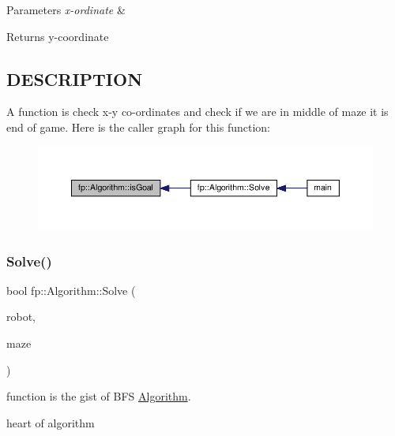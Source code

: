 \begin{DoxyParams}{Parameters}
{\em x-\/ordinate} & \\
\hline
\end{DoxyParams}
\begin{DoxyReturn}{Returns}
y-\/coordinate 
\end{DoxyReturn}
\hypertarget{_m_a_z_e_8h_DESCRIPTION}{}\subsection{D\+E\+S\+C\+R\+I\+P\+T\+I\+ON}\label{_m_a_z_e_8h_DESCRIPTION}
A function is check x-\/y co-\/ordinates and check if we are in middle of maze it is end of game. Here is the caller graph for this function\+:
\nopagebreak
\begin{figure}[H]
\begin{center}
\leavevmode
\includegraphics[width=350pt]{classfp_1_1_algorithm_a237fc28eed2899786cd06f4e5a0e7333_icgraph}
\end{center}
\end{figure}
\mbox{\label{classfp_1_1_algorithm_a2e66300e1507ff3f71d5fbbffede52a3}} 
\subsubsection{\texorpdfstring{Solve()}{Solve()}}
{\footnotesize\ttfamily bool fp\+::\+Algorithm\+::\+Solve (\begin{DoxyParamCaption}\item[{std\+::shared\+\_\+ptr$<$ \hyperlink{classfp_1_1_land_based_robot}{fp\+::\+Land\+Based\+Robot} $>$}]{robot,  }\item[{\hyperlink{classfp_1_1_maze}{fp\+::\+Maze} \&}]{maze }\end{DoxyParamCaption})}



function is the gist of B\+FS \hyperlink{classfp_1_1_algorithm}{Algorithm}. 

heart of algorithm

